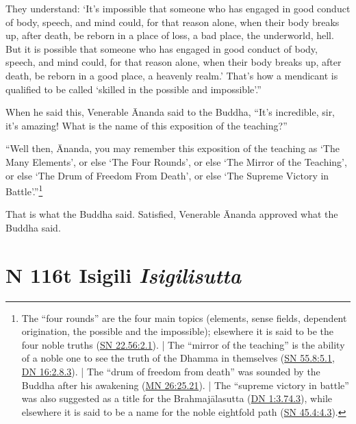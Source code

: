 \documentclass[12pt,openany]{book}%
\newcommand*{\suttatitleacronym}[1]{\smaller[2]{#1}\vspace*{.3em}}
\newcommand*{\suttatitletranslation}[1]{\linebreak{#1}}
\newcommand*{\suttatitleroot}[1]{\linebreak\smaller[2]\itshape{#1}}
\newcommand*{\tocacronym}[1]{\hspace*{-3.3em}{#1}\quad}
\newcommand*{\toctranslation}[1]{#1}
\newcommand*{\tocroot}[1]{(\textit{#1})}
\begin{document}
They understand: ‘It’s impossible that someone who has engaged in good conduct of body, speech, and mind could, for that reason alone, when their body breaks up, after death, be reborn in a place of loss, a bad place, the underworld, hell. But it is possible that someone who has engaged in good conduct of body, speech, and mind could, for that reason alone, when their body breaks up, after death, be reborn in a good place, a heavenly realm.’ That’s how a mendicant is qualified to be called ‘skilled in the possible and impossible’.” 

When he said this, Venerable Ānanda said to the Buddha, “It’s incredible, sir, it’s amazing! What is the name of this exposition of the teaching?” 

“Well then, Ānanda, you may remember this exposition of the teaching as ‘The Many Elements’, or else ‘The Four Rounds’, or else ‘The Mirror of the Teaching’, or else ‘The Drum of Freedom From Death’, or else ‘The Supreme Victory in Battle’.”\footnote{The “four rounds” are the four main topics (elements, sense fields, dependent origination, the possible and the impossible); elsewhere it is said to be the four noble truths (\href{https://suttacentral.net/sn22.56/en/sujato\#2.1}{SN 22.56:2.1}). | The “mirror of the teaching” is the ability of a noble one to see the truth of the Dhamma in themselves (\href{https://suttacentral.net/sn55.8/en/sujato\#5.1}{SN 55.8:5.1}, \href{https://suttacentral.net/dn16/en/sujato\#2.8.3}{DN 16:2.8.3}). | The “drum of freedom from death” was sounded by the Buddha after his awakening (\href{https://suttacentral.net/mn26/en/sujato\#25.21}{MN 26:25.21}). | The “supreme victory in battle” was also suggested as a title for the \textsanskrit{Brahmajālasutta} (\href{https://suttacentral.net/dn1/en/sujato\#3.74.3}{DN 1:3.74.3}), while elsewhere it is said to be a name for the noble eightfold path (\href{https://suttacentral.net/sn45.4/en/sujato\#4.3}{SN 45.4:4.3}). } 

That is what the Buddha said. Satisfied, Venerable Ānanda approved what the Buddha said. 

%
\section*{{\suttatitleacronym MN 116}{\suttatitletranslation At Isigili }{\suttatitleroot Isigilisutta}}
\addcontentsline{toc}{section}{\tocacronym{MN 116} \toctranslation{At Isigili } \tocroot{Isigilisutta}}
\end{document}
